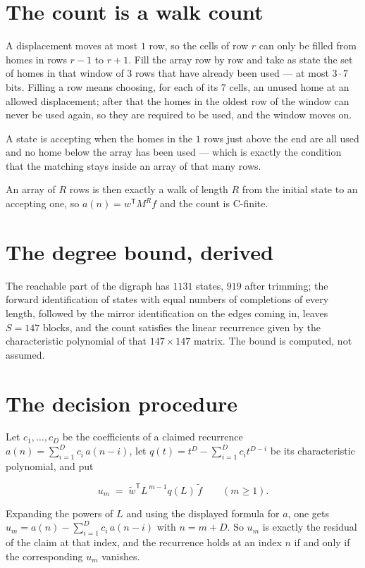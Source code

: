 \documentclass[11pt]{article}
\theoremstyle{definition}
\begin{document}
\section{The count is a walk count}

A displacement moves at most $1$ row, so the cells of row $r$ can only be filled from homes in rows $r-1$ to $r+1$. Fill the array row by row and take as state the set of homes in that window of $3$ rows that have already been used --- at most $3\cdot7$ bits. Filling a row means choosing, for each of its $7$ cells, an unused home at an allowed displacement; after that the homes in the oldest row of the window can never be used again, so they are required to be used, and the window moves on.

A state is accepting when the homes in the $1$ rows just above the end are all used and no home below the array has been used --- which is exactly the condition that the matching stays inside an array of that many rows.

An array of $R$ rows is then exactly a walk of length $R$ from the initial state to an accepting one, so $a(n) = w^{\mathsf T}M^{R}f$ and the count is C-finite.

\section{The degree bound, derived}

The reachable part of the digraph has $1131$ states, $919$ after trimming; the forward identification of states with equal numbers of completions of every length, followed by the mirror identification on the edges coming in, leaves $S = 147$ blocks, and the count satisfies the linear recurrence given by the characteristic polynomial of that $147\times147$ matrix. The bound is computed, not assumed.

\section{The decision procedure}

Let $c_1,\dots,c_D$ be the coefficients of a claimed recurrence $a(n) = \sum_{i=1}^{D} c_i\,a(n-i)$, let $q(t) = t^{D} - \sum_{i=1}^{D} c_i t^{D-i}$ be its characteristic polynomial, and put

\[u_m \;=\; \tilde w^{\mathsf T} L^{\,m-1} q(L)\,\tilde f \qquad (m \ge 1).\]

Expanding the powers of $L$ and using the displayed formula for $a$, one gets $u_m = a(n) - \sum_{i=1}^{D} c_i\,a(n-i)$ with $n = m + D$. So $u_m$ is exactly the residual of the claim at that index, and the recurrence holds at an index $n$ if and only if the corresponding $u_m$ vanishes.
\end{document}
